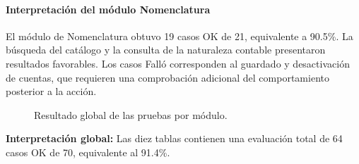 \paragraph{Interpretación del módulo Nomenclatura}
El módulo de Nomenclatura obtuvo 19 casos OK de 21, equivalente a 90.5\%. La búsqueda del catálogo y la consulta de la naturaleza contable presentaron resultados favorables. Los casos Falló corresponden al guardado y desactivación de cuentas, que requieren una comprobación adicional del comportamiento posterior a la acción.

\begin{figure}[H]
\centering
\caption{Resultado global de las pruebas por módulo.}\label{fig:cap4_grafica_global}
\end{figure}

\noindent\textbf{Interpretación global:} Las diez tablas contienen una evaluación total de 64 casos OK de 70, equivalente al 91.4\%.
